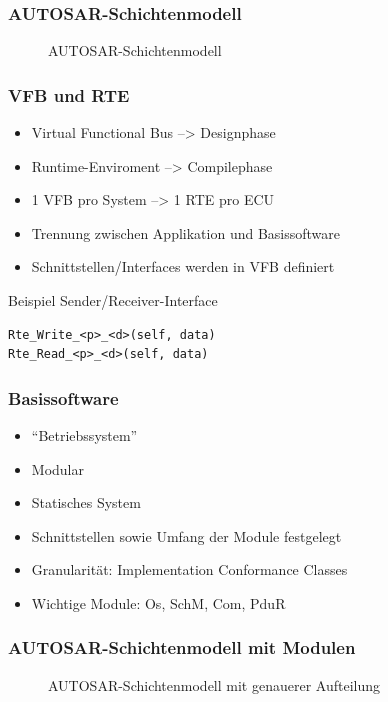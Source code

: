 \documentclass[]{beamer}
\newcommand{\inputImage}[1]{}
\begin{document}
\begin{frame}
\frametitle{AUTOSAR-Schichtenmodell}
    \begin{figure}[ht]
        \centering
        \resizebox{0.98\linewidth}{!}{\inputImage{autosar_layer.dia}}
        \caption{AUTOSAR-Schichtenmodell}
        \label{fig:autosar_layer}
    \end{figure}
\end{frame}

\begin{frame}[fragile]
\frametitle{VFB und RTE}
    \begin{itemize}
        \item Virtual Functional Bus --> Designphase
        \item Runtime-Enviroment --> Compilephase
        \item 1 VFB pro System --> 1 RTE pro ECU
        \item Trennung zwischen Applikation und Basissoftware
        \item Schnittstellen/Interfaces werden in VFB definiert
    \end{itemize}
    \begin{exampleblock}{Beispiel Sender/Receiver-Interface}
        \begin{verbatim}
Rte_Write_<p>_<d>(self, data)
Rte_Read_<p>_<d>(self, data)
        \end{verbatim}
    \end{exampleblock}
\end{frame}


\begin{frame}
\frametitle{Basissoftware}
    \begin{itemize}
        \item "`Betriebssystem"'
        \item Modular
        \item Statisches System
        \item Schnittstellen sowie Umfang der Module festgelegt
        \item Granularität: Implementation Conformance Classes
        \item Wichtige Module: Os, SchM, Com, PduR
    \end{itemize}
\end{frame}


\begin{frame}
\frametitle{AUTOSAR-Schichtenmodell mit Modulen}
    \begin{figure}[ht]
        \centering
        \resizebox{0.98\linewidth}{!}{\inputImage{autosar_refined_layer.dia}}
        \caption{AUTOSAR-Schichtenmodell mit genauerer Aufteilung}
        \label{fig:autosar_refined_layer}
    \end{figure}
\end{frame}
\end{document}
